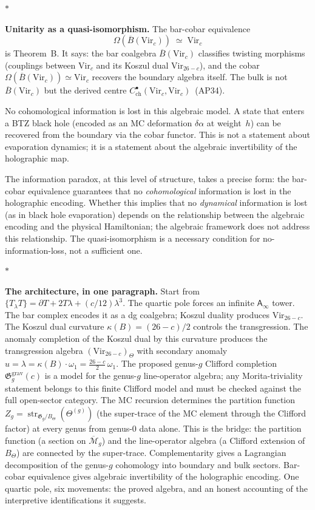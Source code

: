 \documentclass[11pt]{article}
\newcommand{\cM}{\mathcal{M}}
\newcommand{\barB}{\overline{B}}
\newcommand{\Ainf}{\mathsf{A}_{\infty}}
\newcommand{\sep}{\bigskip\begin{center}$*$\end{center}\medskip}
\begin{document}
\sep

\noindent\textbf{Unitarity as a quasi-isomorphism.}
The bar-cobar equivalence
\[
\Omega(\barB(\mathrm{Vir}_c)) \;\simeq\; \mathrm{Vir}_c
\]
is Theorem~B.  It says: the bar coalgebra $\barB(\mathrm{Vir}_c)$
classifies twisting morphisms (couplings between $\mathrm{Vir}_c$
and its Koszul dual $\mathrm{Vir}_{26-c}$), and the cobar
$\Omega(\barB(\mathrm{Vir}_c)) \simeq \mathrm{Vir}_c$ recovers
the boundary algebra itself.  The bulk is not~$\barB(\mathrm{Vir}_c)$
but the derived centre $C^\bullet_{\mathrm{ch}}(\mathrm{Vir}_c,
\mathrm{Vir}_c)$~(AP34).

No cohomological information is lost in this algebraic model.  A state that enters a BTZ black hole
(encoded as an MC deformation $\delta\alpha$ at weight~$h$) can
be recovered from the boundary via the cobar functor.  This is
not a statement about evaporation dynamics; it is a statement
about the algebraic invertibility of the holographic map.

The information paradox, at this level of structure, takes a
precise form: the bar-cobar equivalence guarantees that no
\emph{cohomological} information is lost in the holographic
encoding.  Whether this implies that no \emph{dynamical}
information is lost (as in black hole evaporation) depends on
the relationship between the algebraic encoding and the
physical Hamiltonian; the algebraic framework
does not address this relationship.  The quasi-isomorphism is a necessary
condition for no-information-loss, not a sufficient one.

\sep

\noindent\textbf{The architecture, in one paragraph.}
Start from $\{T_\lambda T\} = \partial T + 2T\lambda +
(c/12)\lambda^3$.  The quartic pole forces an infinite $\Ainf$
tower.  The bar complex encodes it as a dg coalgebra; Koszul
duality produces $\mathrm{Vir}_{26-c}$.  The Koszul dual
curvature $\kappa(B) = (26-c)/2$ controls the transgression.
The anomaly completion of the Koszul dual by this curvature
produces the transgression algebra $(\mathrm{Vir}_{26-c})_\Theta$
with secondary anomaly $u = \lambda = \kappa(B) \cdot \omega_1
= \tfrac{26-c}{2}\,\omega_1$.  The proposed
genus-$g$ Clifford completion
$\mathfrak{G}_g^{\mathrm{grav}}(c)$ is a model for the
genus-$g$ line-operator algebra; any Morita-triviality statement
belongs to this finite Clifford model and must be checked against
the full open-sector category.
The MC recursion determines the partition function
$Z_g = \operatorname{str}_{\mathfrak{G}_g/B_\Theta}(\Theta^{(g)})$
(the super-trace of the MC element through the Clifford factor)
at every genus from genus-$0$ data alone.  This is the bridge:
the partition function (a section on $\overline{\cM}_g$) and the
line-operator algebra (a Clifford extension of $B_\Theta$) are
connected by the super-trace.
Complementarity gives a Lagrangian decomposition of the
genus-$g$ cohomology into boundary and bulk sectors.
Bar-cobar equivalence gives algebraic invertibility of the
holographic encoding.  One quartic pole, six movements:
the proved algebra, and an honest accounting of the
interpretive identifications it suggests.
\end{document}
